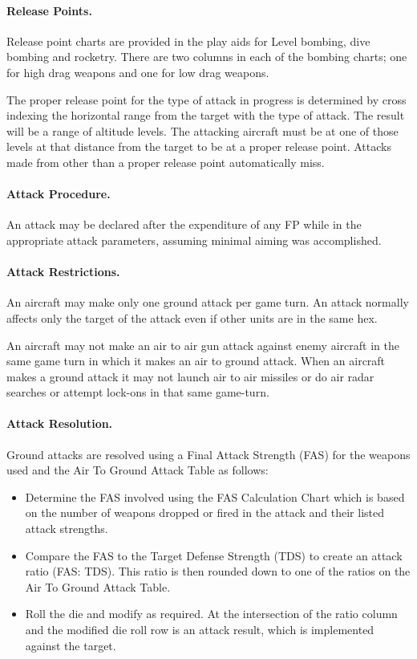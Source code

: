 \paragraph{Release Points.} Release point charts are provided in the play aids for Level bombing, dive bombing and rocketry. There are two columns in each of the bombing charts; one for high drag weapons and one for low drag weapons.

The proper release point for the type of attack in progress is determined by cross indexing the horizontal range from the target with the type of attack. The result will be a range of altitude levels. The attacking aircraft must be at one of those levels at that distance from the target to be at a proper release point. Attacks made from other than a proper release point automatically miss.

\paragraph{Attack Procedure.} An attack may be declared after the expenditure of any FP while in the appropriate attack parameters, assuming minimal aiming was accomplished.

\paragraph{Attack Restrictions.} An aircraft may make only one ground attack per game turn. An attack normally affects only the target of the attack even if other units are in the same hex.

An aircraft may not make an air to air gun attack against enemy aircraft in the same game turn in which it makes an air to ground attack. When an aircraft makes a ground attack it may not launch air to air missiles or do air radar searches or attempt lock-ons in that same game-turn.

\paragraph{Attack Resolution.} Ground attacks are resolved using a Final Attack Strength (FAS) for the weapons used and the Air To Ground Attack Table as follows:
\begin{itemize}
\item Determine the FAS involved using the FAS Calculation Chart which is based on the number of weapons dropped or fired in the attack and their listed attack strengths.
\item Compare the FAS to the Target Defense Strength (TDS) to create an attack ratio (FAS: TDS). This ratio is then rounded down to one of the ratios on the Air To Ground Attack Table.
\item Roll the die and modify as required. At the intersection of the ratio column and the modified die roll row is an attack result, which is implemented against the target.
\end{itemize}

